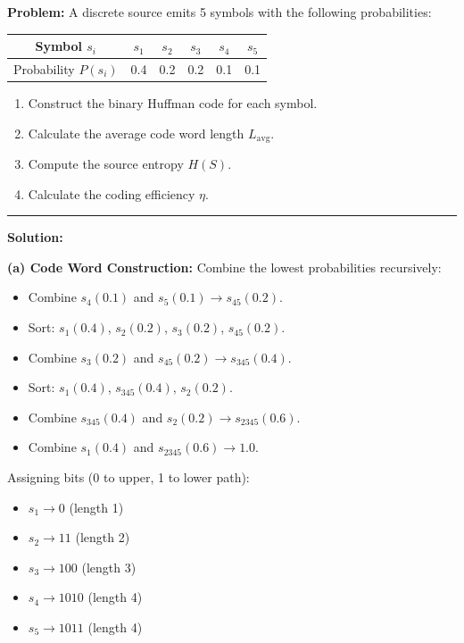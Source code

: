 \documentclass[12pt,a4paper]{article}
\renewcommand{\arraystretch}{1.45}
\begin{document}
\begin{tcolorbox}[examplebox, title={Huffman Coding Design}]
\textbf{Problem:} A discrete source emits 5 symbols with the following probabilities:
\begin{center}
  \small
  {\renewcommand{\arraystretch}{1.65}%
\begin{tabular}{|c|c|c|c|c|c|}
\hline
Symbol $s_i$ & $s_1$ & $s_2$ & $s_3$ & $s_4$ & $s_5$ \\[4pt]
\hline
Probability $P(s_i)$ & 0.4 & 0.2 & 0.2 & 0.1 & 0.1 \\[4pt]
\hline
\end{tabular}}
\end{center}
\begin{enumerate}[label=(\alph*), leftmargin=*, itemsep=2pt]
  \item Construct the binary Huffman code for each symbol.
  \item Calculate the average code word length $L_{\text{avg}}$.
  \item Compute the source entropy $H(S)$.
  \item Calculate the coding efficiency $\eta$.
\end{enumerate}

\par\noindent\rule{\linewidth}{0.5pt}\par
\textbf{Solution:}

\textbf{(a) Code Word Construction:}
Combine the lowest probabilities recursively:
\begin{itemize}[leftmargin=1.5em, itemsep=2.5pt]
  \item Combine $s_4(0.1)$ and $s_5(0.1) \rightarrow s_{45}(0.2)$.
  \item Sort: $s_1(0.4)$, $s_2(0.2)$, $s_3(0.2)$, $s_{45}(0.2)$.
  \item Combine $s_3(0.2)$ and $s_{45}(0.2) \rightarrow s_{345}(0.4)$.
  \item Sort: $s_1(0.4)$, $s_{345}(0.4)$, $s_2(0.2)$.
  \item Combine $s_{345}(0.4)$ and $s_2(0.2) \rightarrow s_{2345}(0.6)$.
  \item Combine $s_1(0.4)$ and $s_{2345}(0.6) \rightarrow 1.0$.
\end{itemize}
Assigning bits (0 to upper, 1 to lower path):
\begin{itemize}[leftmargin=1.5em, itemsep=2pt]
  \item $s_1 \rightarrow 0$ (length 1)
  \item $s_2 \rightarrow 11$ (length 2)
  \item $s_3 \rightarrow 100$ (length 3)
  \item $s_4 \rightarrow 1010$ (length 4)
  \item $s_5 \rightarrow 1011$ (length 4)
\end{itemize}


\end{tcolorbox}
\end{document}
